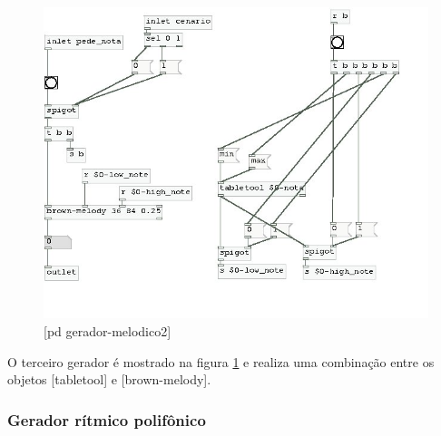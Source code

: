 \documentclass{ppgmus}
\begin{document}
\begin{figure}
\includegraphics[scale=.6]{gera-melodico2}
\caption{[pd gerador-melodico2]}
\label{gera-melodico2}
\end{figure}  


O terceiro gerador é mostrado na figura \ref{gera-melodico2} e
realiza uma combinação entre os objetos [tabletool] e [brown-melody].




\subsubsection{Gerador rítmico polifônico}
\end{document}
